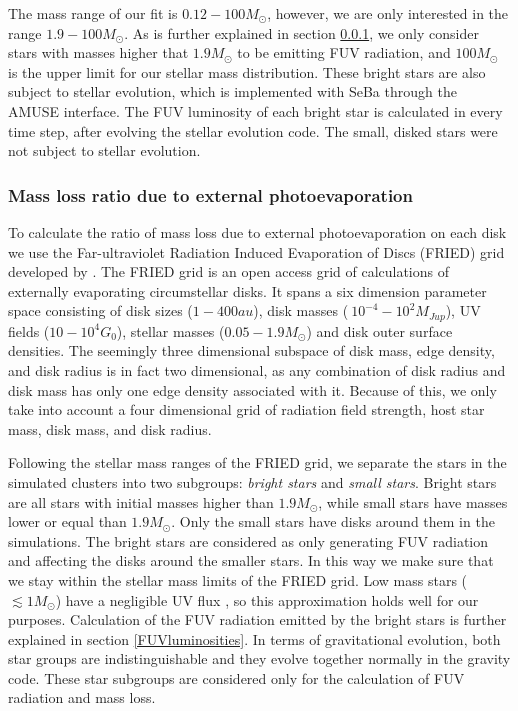 \documentclass[fleqn,usenatbib]{mnras}
\begin{document}


The mass range of our fit is $0.12 - 100 M_{\odot}$, however, we are only interested in the range $1.9 - 100 M_{\odot}$. As is further explained in section \ref{grid}, we only consider stars with masses higher that $1.9 M_{\odot}$ to be emitting FUV radiation, and $100 M_{\odot}$ is the upper limit for our stellar mass distribution. These bright stars are also subject to stellar evolution, which is implemented with SeBa through the AMUSE interface. The FUV luminosity of each bright star is calculated in every time step, after evolving the stellar evolution code. The small, disked stars were not subject to stellar evolution.

\subsubsection{Mass loss ratio due to external photoevaporation}\label{grid}
To calculate the ratio of mass loss due to external photoevaporation on each disk we use the Far-ultraviolet Radiation Induced Evaporation of Discs (FRIED) grid developed by \citet{haworth2018}. The FRIED grid is an open access grid of calculations of externally evaporating circumstellar disks. It spans a six dimension parameter space consisting of disk sizes ($1 - 400 au$), disk masses ($~10^{-4} - 10^{2} M_{Jup}$), UV fields ($10 - 10^{4} G_0$), stellar masses ($0.05 - 1.9 M_{\odot}$) and disk outer surface densities. The seemingly three dimensional subspace of disk mass, edge density, and disk radius is in fact two dimensional, as any combination of disk radius and disk mass has only one edge density associated with it. Because of this, we only take into account a four dimensional grid of radiation field strength, host star mass, disk mass, and disk radius.

Following the stellar mass ranges of the FRIED grid, we separate the stars in the simulated clusters into two subgroups: \textit{bright stars} and \textit{small stars}. Bright stars are all stars with initial masses higher than $1.9 M_{\odot}$, while small stars have masses lower or equal than $1.9 M_{\odot}$. Only the small stars have disks around them in the simulations. The bright stars are considered as only generating FUV radiation and affecting the disks around the smaller stars. In this way we make sure that we stay within the stellar mass limits of the FRIED grid. Low mass stars ($\lesssim 1 M_\odot$) have a negligible UV flux \citep{adams2006}, so this approximation holds well for our purposes. Calculation of the FUV radiation emitted by the bright stars is further explained in section \ref{FUVluminosities}. In terms of gravitational evolution, both star groups are indistinguishable and they evolve together normally in the gravity code. These star subgroups are considered only for the calculation of FUV radiation and mass loss.
\end{document}
